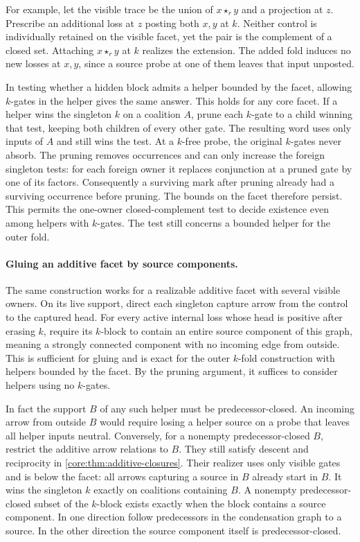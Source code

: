For example, let the visible trace be the union of
$x\star_r y$ and a projection at $z$. Prescribe an
additional loss at $z$ posting both $x,y$ at $k$.
Neither control is individually retained on the
visible facet, yet the pair is the complement of a
closed set. Attaching $x\star_r y$ at $k$ realizes
the extension. The added fold induces no new losses
at $x,y$, since a source probe at one of them leaves
that input unposted.

In testing whether a hidden block admits a helper
bounded by the facet, allowing $k$-gates in the
helper gives the same answer. This holds for any
core facet. If a helper wins the singleton $k$ on
a coalition $A$, prune each $k$-gate to a child
winning that test, keeping both children of every
other gate. The resulting word uses only inputs of
$A$ and still wins the test. At a $k$-free probe,
the original $k$-gates never absorb. The pruning
removes occurrences and can only increase the
foreign singleton tests: for each foreign owner
it replaces conjunction at a pruned gate by one
of its factors. Consequently a surviving mark
after pruning already had a surviving occurrence
before pruning. The bounds on the facet therefore
persist. This permits the one-owner closed-complement
test to decide existence even among helpers with
$k$-gates. The test still concerns a bounded helper
for the outer fold.

\paragraph{Gluing an additive facet by source components.}
The same construction works for a realizable additive
facet with several visible owners. On its live
support, direct each singleton capture arrow from
the control to the captured head. For every active
internal loss whose head is positive after erasing
$k$, require its $k$-block to contain an entire source
component of this graph, meaning a strongly connected
component with no incoming edge from outside. This
is sufficient for gluing and is exact for the outer
$k$-fold construction with helpers bounded by the
facet. By the pruning argument, it suffices to
consider helpers using no $k$-gates.

In fact the support $B$ of any such helper must be
predecessor-closed. An incoming arrow from outside
$B$ would require losing a helper source on a probe
that leaves all helper inputs neutral. Conversely,
for a nonempty predecessor-closed $B$, restrict the
additive arrow relations to $B$. They still satisfy
descent and reciprocity in
\cref{core:thm:additive-closures}. Their realizer uses
only visible gates and is below the facet: all
arrows capturing a source in $B$ already start in
$B$. It wins the singleton $k$ exactly on coalitions
containing $B$. A nonempty predecessor-closed
subset of the $k$-block exists exactly when the
block contains a source component. In one direction
follow predecessors in the condensation graph to
a source. In the other direction the source
component itself is predecessor-closed.

